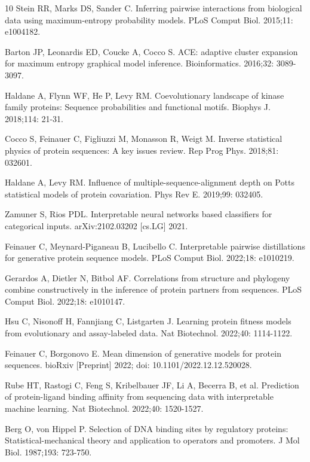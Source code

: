 \documentclass[10pt,letterpaper]{article}
\begin{document}
\begin{thebibliography}{10}
 Stein RR, Marks DS, Sander C. Inferring pairwise interactions from biological data using maximum-entropy probability models. PLoS Comput Biol. 2015;11: e1004182. 

 Barton JP, Leonardis ED, Coucke A, Cocco S. ACE: adaptive cluster expansion for maximum entropy graphical model inference. Bioinformatics. 2016;32: 3089-3097. 

 Haldane A, Flynn WF, He P, Levy RM. Coevolutionary landscape of kinase family proteins: Sequence probabilities and functional motifs. Biophys J. 2018;114: 21-31.

 Cocco S, Feinauer C, Figliuzzi M, Monasson R, Weigt M. Inverse statistical physics of protein sequences: A key issues review. Rep Prog Phys. 2018;81: 032601. 

 Haldane A, Levy RM. Influence of multiple-sequence-alignment depth on Potts statistical models of protein covariation. Phys Rev E. 2019;99: 032405. 

 Zamuner S, Rios PDL. Interpretable neural networks based classifiers for categorical inputs. arXiv:2102.03202 [cs.LG] 2021. 

 Feinauer C, Meynard-Piganeau B, Lucibello C. Interpretable pairwise distillations for generative protein sequence models. PLoS Comput Biol. 2022;18: e1010219. 

 Gerardos A, Dietler N, Bitbol AF. Correlations from structure and phylogeny combine constructively in the inference of protein partners from sequences. PLoS Comput Biol. 2022;18: e1010147. 

 Hsu C, Nisonoff H, Fannjiang C, Listgarten J. Learning protein fitness models from evolutionary and assay-labeled data. Nat Biotechnol. 2022;40: 1114-1122. 

 Feinauer C, Borgonovo E. Mean dimension of generative models for protein sequences. bioRxiv [Preprint] 2022; doi: 10.1101/2022.12.12.520028. %

 Rube HT, Rastogi C, Feng S, Kribelbauer JF, Li A, Becerra B, et al. Prediction of protein-ligand binding affinity from sequencing data with interpretable machine learning. Nat Biotechnol. 2022;40: 1520-1527. 

 Berg O, von Hippel P. Selection of DNA binding sites by regulatory proteins: Statistical-mechanical theory and application to operators and promoters. J Mol Biol. 1987;193: 723-750.


\end{thebibliography}
\end{document}
